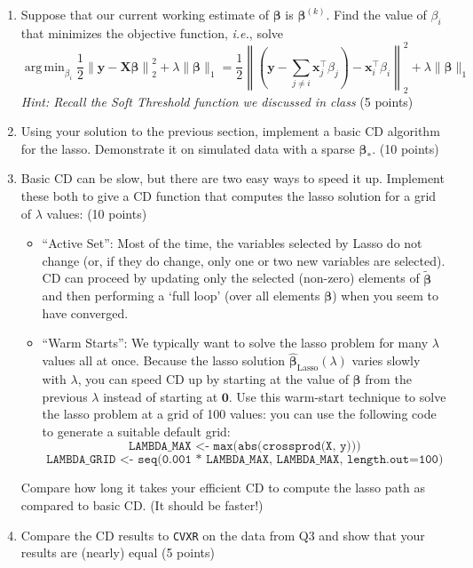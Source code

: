 \documentclass[10pt]{article}
\newcommand{\bzero}{\bm{0}}
\newcommand{\bx}{\bm{x}}
\newcommand{\bX}{\bm{X}}
\newcommand{\by}{\bm{y}}
\newcommand{\bbeta}{\bm{\beta}}
\DeclareMathOperator{\argmin}{arg\,min}
\begin{document}
\begin{enumerate}[label=Q5(\alph*).]
\item Suppose that our current working estimate of $\bbeta$ is $\bbeta^{(k)}$. Find the value of $\beta_i$ that minimizes the objective function, \emph{i.e.}, solve
\[\argmin_{\beta_i} \frac{1}{2}\left\|\by - \bX\bbeta\right\|_2^2 + \lambda \|\bbeta\|_1 = \frac{1}{2}\left\|\left(\by - \sum_{j \neq i} \bx_j^{\top}\beta_j\right) - \bx_i^{\top}\beta_i  \right\|_2^2 + \lambda \|\bbeta\|_1\]
\emph{Hint: Recall the Soft Threshold function we discussed in class} (5 points)
\item Using your solution to the previous section, implement a basic CD algorithm for the lasso. Demonstrate it on simulated data with a sparse $\bbeta_*$. (10 points) 
\item Basic CD can be slow, but there are two easy ways to speed it up. Implement these both to give a CD function that computes the lasso solution for a grid of $\lambda$ values: (10 points) 
\begin{itemize}
    \item ``Active Set'': Most of the time, the variables selected by Lasso do not change (or, if they do change, only one or two new variables are selected). CD can proceed by updating only the selected (non-zero) elements of $\tilde{\bbeta}$ and then performing a `full loop' (over all elements $\bbeta$) when you seem to have converged. 
    \item ``Warm Starts'': We typically want to solve the lasso problem for many $\lambda$ values all at once. Because the lasso solution $\hat{\bbeta}_{\text{Lasso}}(\lambda)$ varies slowly with $\lambda$, you can speed CD up by starting at the value of $\bbeta$ from the previous $\lambda$ instead of starting at $\bzero$. Use this warm-start technique to solve the lasso problem at a grid of 100 values: you can use the following code to generate a suitable default grid: 
    \[\texttt{LAMBDA\_MAX <- max(abs(crossprod(X, y)))}\]\[\texttt{LAMBDA\_GRID <- seq(0.001 * LAMBDA\_MAX, LAMBDA\_MAX, length.out=100)}\]
\end{itemize}
Compare how long it takes your efficient CD to compute the lasso path as compared to basic CD. (It should be faster!)
\item Compare the CD results to \texttt{CVXR} on the data from Q3 and show that your results are (nearly) equal (5 points)
\end{enumerate}
\end{document}

